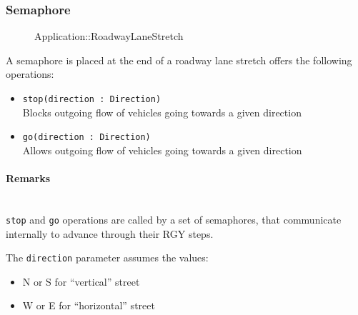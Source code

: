 \subsubsection{Semaphore}
\begin{figure}[h]
\centering
{}
\caption{Application::RoadwayLaneStretch}
\end{figure}
\FloatBarrier
A semaphore is placed at the end of a roadway lane stretch offers the following operations:
\begin{itemize}
	\item \texttt{stop(direction : Direction)}
	\\Blocks outgoing flow of vehicles going towards a given direction
	\item \texttt{go(direction : Direction)}
	\\Allows outgoing flow of vehicles going towards a given direction
\end{itemize}
\paragraph{Remarks}
\ \\\texttt{stop} and \texttt{go} operations are called by a set of semaphores, that communicate internally to advance through their RGY steps.

The \texttt{direction} parameter assumes the values:
\begin{itemize}
	\item N or S  for “vertical” street
	\item W or E for “horizontal” street
\end{itemize}
